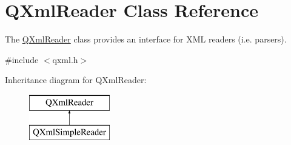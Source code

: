 \hypertarget{class_q_xml_reader}{}\section{Q\+Xml\+Reader Class Reference}
\label{class_q_xml_reader}


The \mbox{\hyperlink{class_q_xml_reader}{Q\+Xml\+Reader}} class provides an interface for X\+ML readers (i.\+e. parsers).  




{\ttfamily \#include $<$qxml.\+h$>$}

Inheritance diagram for Q\+Xml\+Reader\+:\begin{figure}[H]
\begin{center}
\leavevmode
\includegraphics[height=2.000000cm]{class_q_xml_reader}
\end{center}
\end{figure}
